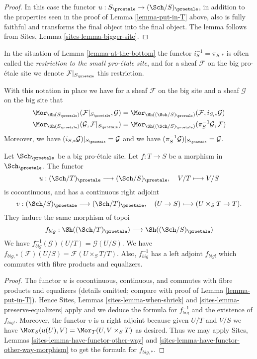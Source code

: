 \begin{proof}
In this case the functor $u : S_\proetale \to (\Sch/S)_\proetale$,
in addition to the properties seen in the proof of
Lemma \ref{lemma-put-in-T} above, also is fully faithful
and transforms the final object into the final object.
The lemma follows from Sites, Lemma \ref{sites-lemma-bigger-site}.
\end{proof}

\begin{definition}
\label{definition-restriction-small-proetale}
In the situation of
Lemma \ref{lemma-at-the-bottom}
the functor $i_S^{-1} = \pi_{S, *}$ is often
called the {\it restriction to the small pro-\'etale site}, and for a sheaf
$\mathcal{F}$ on the big pro-\'etale site we denote
$\mathcal{F}|_{S_\proetale}$ this restriction.
\end{definition}

\noindent
With this notation in place we have for a sheaf $\mathcal{F}$ on the
big site and a sheaf $\mathcal{G}$ on the big site that
\begin{align*}
\Mor_{\Sh(S_\proetale)}(\mathcal{F}|_{S_\proetale}, \mathcal{G})
& =
\Mor_{\Sh((\Sch/S)_\proetale)}(\mathcal{F},
i_{S, *}\mathcal{G}) \\
\Mor_{\Sh(S_\proetale)}(\mathcal{G}, \mathcal{F}|_{S_\proetale})
& =
\Mor_{\Sh((\Sch/S)_\proetale)}(\pi_S^{-1}\mathcal{G}, \mathcal{F})
\end{align*}
Moreover, we have $(i_{S, *}\mathcal{G})|_{S_\proetale} = \mathcal{G}$
and we have $(\pi_S^{-1}\mathcal{G})|_{S_\proetale} = \mathcal{G}$.

\begin{lemma}
\label{lemma-morphism-big}
Let $\Sch_\proetale$ be a big pro-\'etale site.
Let $f : T \to S$ be a morphism in $\Sch_\proetale$.
The functor
$$
u : (\Sch/T)_\proetale \longrightarrow (\Sch/S)_\proetale, \quad
V/T \longmapsto V/S
$$
is cocontinuous, and has a continuous right adjoint
$$
v : (\Sch/S)_\proetale \longrightarrow (\Sch/T)_\proetale, \quad
(U \to S) \longmapsto (U \times_S T \to T).
$$
They induce the same morphism of topoi
$$
f_{big} :
\Sh((\Sch/T)_\proetale)
\longrightarrow
\Sh((\Sch/S)_\proetale)
$$
We have $f_{big}^{-1}(\mathcal{G})(U/T) = \mathcal{G}(U/S)$.
We have $f_{big, *}(\mathcal{F})(U/S) = \mathcal{F}(U \times_S T/T)$.
Also, $f_{big}^{-1}$ has a left adjoint $f_{big!}$ which commutes with
fibre products and equalizers.
\end{lemma}

\begin{proof}
The functor $u$ is cocontinuous, continuous, and commutes with fibre products
and equalizers (details omitted; compare with proof of
Lemma \ref{lemma-put-in-T}). Hence
Sites, Lemmas \ref{sites-lemma-when-shriek} and
\ref{sites-lemma-preserve-equalizers}
apply and we deduce the formula
for $f_{big}^{-1}$ and the existence of $f_{big!}$. Moreover,
the functor $v$ is a right adjoint because given $U/T$ and $V/S$
we have $\Mor_S(u(U), V) = \Mor_T(U, V \times_S T)$
as desired. Thus we may apply
Sites, Lemmas \ref{sites-lemma-have-functor-other-way} and
\ref{sites-lemma-have-functor-other-way-morphism}
to get the formula for $f_{big, *}$.
\end{proof}

